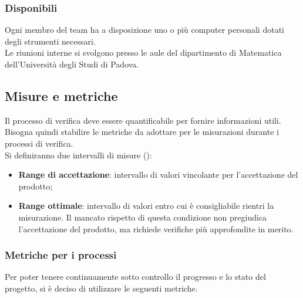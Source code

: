 \documentclass[../PianoDiQualifica.tex]{subfiles}
\begin{document}
			\subsubsection{Disponibili}
				Ogni membro del team ha a disposizione uno o più computer
				personali dotati degli strumenti necessari.\\
				Le riunioni interne si svolgono presso le aule del dipartimento
				di Matematica dell'Università degli Studi di Padova.
		\subsection{Misure e metriche}\label{Misure&Metriche}
			Il processo di verifica deve essere quantificabile per fornire
			informazioni utili. Bisogna quindi stabilire le metriche da adottare
			per le misurazioni durante i processi di verifica.\\
			Si definiranno due intervalli di misure ():
			\begin{itemize}
				\item \textbf{Range di accettazione}: intervallo di valori
				vincolante per l'accettazione del prodotto;
				\item \textbf{Range ottimale}: intervallo di valori entro cui è
				consigliabile rientri la misurazione. Il mancato rispetto di
				questa condizione non pregiudica l'accettazione del prodotto, ma
				richiede verifiche più approfondite in merito.
			\end{itemize}
			\subsubsection{Metriche per i processi}\label{MetrichePerIProcessi}
				Per poter tenere continuamente sotto controllo il progresso e lo stato del progetto,
				si è deciso di utilizzare le seguenti metriche.
\end{document}
